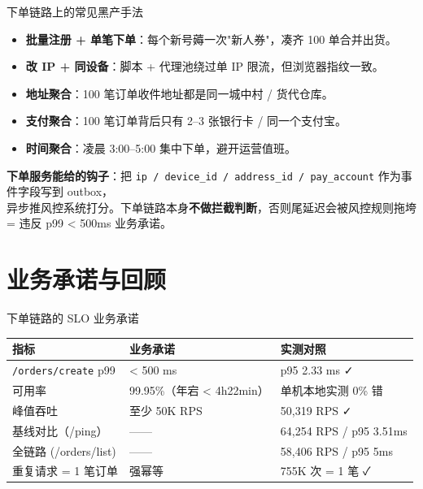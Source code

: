 \documentclass[aspectratio=169,11pt]{beamer}
\begin{document}
\begin{frame}[shrink]{下单链路上的常见黑产手法}
\begin{itemize}
  \item \textbf{批量注册 + 单笔下单}：每个新号薅一次"新人券"，凑齐 100 单合并出货。
  \item \textbf{改 IP + 同设备}：脚本 + 代理池绕过单 IP 限流，但浏览器指纹一致。
  \item \textbf{地址聚合}：100 笔订单收件地址都是同一城中村 / 货代仓库。
  \item \textbf{支付聚合}：100 笔订单背后只有 2--3 张银行卡 / 同一个支付宝。
  \item \textbf{时间聚合}：凌晨 3:00--5:00 集中下单，避开运营值班。
\end{itemize}
\vspace{2mm}
\small \textbf{下单服务能给的钩子}：把 \texttt{ip / device\_id / address\_id / pay\_account} 作为事件字段写到 outbox，\\
异步推风控系统打分。下单链路本身\textbf{不做拦截判断}，否则尾延迟会被风控规则拖垮 = 违反 p99 < 500ms 业务承诺。
\end{frame}

\section{业务承诺与回顾}

\begin{frame}[shrink]{下单链路的 SLO 业务承诺}
\begin{tabular}{@{}lll@{}}
\toprule
指标 & 业务承诺 & 实测对照 \\
\midrule
\texttt{/orders/create} p99 & < 500 ms          & p95 2.33 ms ✓ \\
可用率                       & 99.95\%（年宕 < 4h22min）& 单机本地实测 0\% 错 \\
峰值吞吐                     & 至少 50K RPS       & 50,319 RPS ✓ \\
基线对比（/ping）            & ——               & 64,254 RPS / p95 3.51ms \\
全链路 (/orders/list)        & ——               & 58,406 RPS / p95 5ms \\
重复请求 = 1 笔订单          & 强幂等            & 755K 次 = 1 笔 ✓ \\
\bottomrule
\end{tabular}
\vspace{2mm}
\end{frame}
\end{document}
